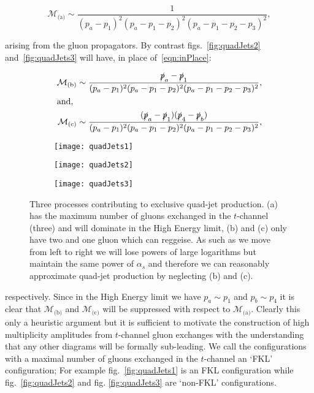 		\begin{equation}
			\mathcal{M}_{\text{(a)}}\sim\frac{1}{(p_a - p_1)^2(p_a - p_1 - p_2)^2(p_a - p_1 - p_2 - p_3)^2},
			\label{eqn:inPlace}
		\end{equation}

		arising from the gluon propagators.  By contrast figs.~\eqref{fig:quadJets2} and~\eqref{fig:quadJets3} will
		have, in place of~\eqref{eqn:inPlace}:

		\begin{align}
			\mathcal{M}_{\text{(b)}}\sim\frac{\slashed p_a - \slashed p_1}
			{(p_a - p_1)^2(p_a - p_1 - p_2)^2(p_a - p_1 - p_2 - p_3)^2},\\
			\intertext{and,}
			\mathcal{M}_{\text{(c)}}\sim\frac{(\slashed p_a - \slashed p_1)(\slashed p_4 - \slashed p_b)}
			{(p_a - p_1)^2(p_a - p_1 - p_2)^2(p_a - p_1 - p_2 - p_3)^2},
		\end{align}

		\begin{figure}[bt]

			\centering

			\begin{subfigure}[b]{0.31\textwidth}
				\texttt{[image: quadJets1]}
				\caption{}
				\label{fig:quadJets1}
			\end{subfigure}
			\begin{subfigure}[b]{0.31\textwidth}
				\texttt{[image: quadJets2]}
				\caption{}
				\label{fig:quadJets2}
			\end{subfigure}
			\begin{subfigure}[b]{0.31\textwidth}
				\texttt{[image: quadJets3]}
				\caption{}
				\label{fig:quadJets3}
			\end{subfigure}

			\caption{Three processes contributing to exclusive quad-jet production. (a) has the
			maximum number of gluons exchanged in the $t$-channel (three) and will dominate in the High
			Energy limit, (b) and (c) only have two and one gluon which can reggeise.  As such as we move
			from left to right we will lose powers of large logarithms but maintain the same power of
			$\alpha_s$ and therefore we can reasonably approximate quad-jet production by neglecting
			(b) and (c).}
			\label{fig:quadJets}
		\end{figure}

		respectively.  Since in the High
		Energy limit we have $p_a\sim p_1$ and $p_b\sim p_4$ it is clear that $\mathcal{M}_{\text{(b)}}$
		and $\mathcal{M}_{\text{(c)}}$ will be suppressed with respect to $\mathcal{M}_{\text{(a)}}$.
		Clearly this only a heuristic argument but it is sufficient to motivate the construction of
		high multiplicity amplitudes from $t$-channel gluon exchanges with the understanding that any
		other diagrams will be formally sub-leading.  We call the configurations with a maximal
		number of gluons exchanged in the $t$-channel an `FKL' configuration;  For example
		fig.~\eqref{fig:quadJets1} is an FKL configuration while fig.~\eqref{fig:quadJets2} and fig.
		\eqref{fig:quadJets3} are `non-FKL' configurations.

